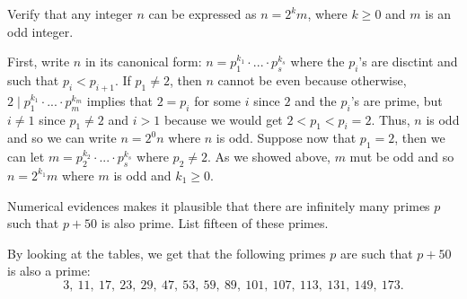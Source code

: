 \begin{exercise}
    Verify that any integer $n$ can be expressed as $n = 2^k m$, where $k \geq 0$ and $m$ is an odd integer. \\
\end{exercise}

\begin{solution}
    First, write $n$ in its canonical form: $n = p_1^{k_1}\cdot ... \cdot p_s^{k_s}$ where the $p_i$'s are disctint and such that $p_i < p_{i+1}$. If $p_1 \neq 2$, then $n$ cannot be even because otherwise, $2 \mid p_1^{k_1}\cdot ... \cdot p_m^{k_m}$ implies that $2 = p_i$ for some $i$ since $2$ and the $p_i$'s are prime, but $i \neq 1$ since $p_1 \neq 2$ and $i > 1$ because we would get $2 < p_1 < p_i = 2$. Thus, $n$ is odd and so we can write $n = 2^0 n$ where $n$ is odd. Suppose now that $p_1 = 2$, then we can let $m = p_2^{k_2}\cdot ... \cdot p_s^{k_s}$ where $p_2 \neq 2$. As we showed above, $m$ mut be odd and so $n = 2^{k_1}m$ where $m$ is odd and $k_1 \geq 0$. \\
\end{solution}

\begin{exercise}
    Numerical evidences makes it plausible that there are infinitely many primes $p$ such that $p + 50$ is also prime. List fifteen of these primes. \\
\end{exercise}

\begin{solution}
    By looking at the tables, we get that the following primes $p$ are such that $p + 50$ is also a prime:
    $$3, \ 11, \ 17, \ 23, \ 29, \ 47, \ 53, \ 59, \ 89, \ 101, \ 107, \ 113, \ 131, \ 149, \ 173.$$
\end{solution}